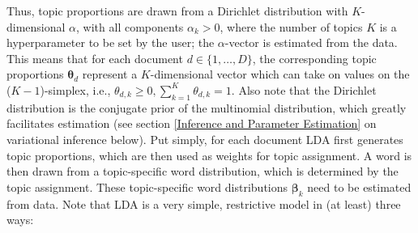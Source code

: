 \noindent
Thus, topic proportions are drawn from a Dirichlet distribution with $K$-dimensional $\alpha$, with all components $\alpha_k > 0$, where the number of topics $K$ is a hyperparameter to be set by the user; the $\alpha$-vector is estimated from the data. This means that for each document $d \in \{1,\dots,D\}$, the corresponding topic proportions $\boldsymbol{\theta}_d$ represent a $K$-dimensional vector which can take on values on the ($K-1$)-simplex, i.e., $\theta_{d,k} \geq 0, \sum_{k=1}^{K}\theta_{d,k}=1$. Also note that the Dirichlet distribution is the conjugate prior of the multinomial distribution, which greatly facilitates estimation (see section \ref{Inference and Parameter Estimation} on variational inference below). Put simply, for each document LDA first generates topic proportions, which are then used as weights for topic assignment. A word is then drawn from a topic-specific word distribution, which is determined by the topic assignment. These topic-specific word distributions $\boldsymbol{\beta}_k$ need to be estimated from data.
Note that LDA is a very simple, restrictive model in (at least) three ways:

